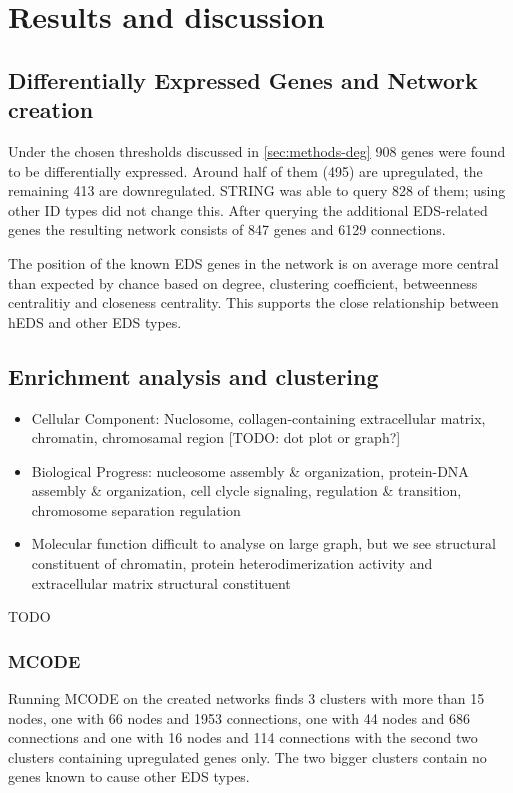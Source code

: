\section{Results and discussion}
\subsection{Differentially Expressed Genes and Network creation}

Under the chosen thresholds discussed in \ref{sec:methods-deg} 908 genes were found to be differentially expressed. Around half of them (495) are upregulated, the remaining 413 are downregulated. STRING was able to query 828 of them; using other ID types did not change this. After querying the additional EDS-related genes the resulting network consists of 847 genes and 6129 connections.

The position of the known EDS genes in the network is on average more central than expected by chance based on degree, clustering coefficient, betweenness centralitiy and closeness centrality. This supports the close relationship between hEDS and other EDS types.

\subsection{Enrichment analysis and clustering}

\begin{itemize}
	\item Cellular Component: Nuclosome, collagen-containing extracellular matrix, chromatin, chromosamal region [TODO: dot plot or graph?]
	\item Biological Progress: nucleosome assembly \& organization, protein-DNA assembly \& organization, cell clycle signaling, regulation \& transition, chromosome separation regulation
	\item Molecular function difficult to analyse on large graph, but we see structural constituent of chromatin, protein heterodimerization activity and extracellular matrix structural constituent
\end{itemize}


TODO

\subsubsection{MCODE}
Running MCODE on the created networks finds 3 clusters with more than 15 nodes, one with 66 nodes and 1953 connections, one with 44 nodes and 686 connections and one with 16 nodes and 114 connections with the second two clusters containing upregulated genes only. The two bigger clusters contain no genes known to cause other EDS types. %

